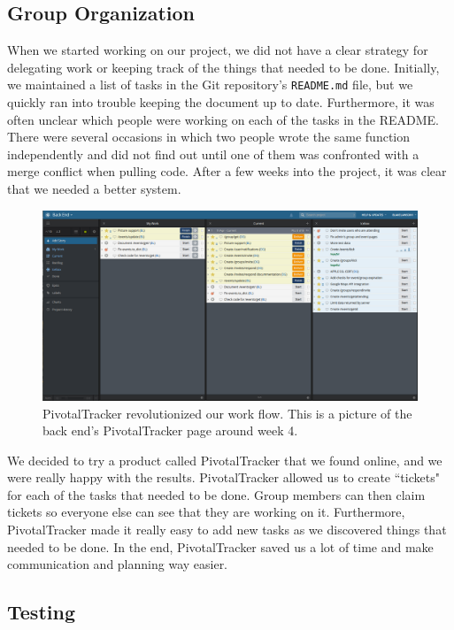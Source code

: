 \documentclass[12pt]{article}
\begin{document}
\subsection{Group Organization}

When we started working on our project, we did not have a clear strategy for 
delegating work or keeping track of the things that needed to be done.
Initially, we maintained a list of tasks in the Git repository's \texttt{README.md} file,
but we quickly ran into trouble keeping the document up to date.
Furthermore, it was often unclear which people were working on each of the tasks in the README.
There were several occasions in which two people wrote the same function independently
and did not find out until one of them was confronted with a merge conflict when pulling code.
After a few weeks into the project, it was clear that we needed a better system.

\begin{figure}
    \centering
    \includegraphics[scale=0.3]{pivotaltracker.png}
    \caption{
        PivotalTracker revolutionized our work flow. 
        This is a picture of the back end's PivotalTracker page around week 4.
    }
    \label{fig:pivotaltracker}
\end{figure}

We decided to try a product called PivotalTracker that we found online,
and we were really happy with the results.
PivotalTracker allowed us to create ``tickets" for each of the tasks that needed to be done.
Group members can then claim tickets so everyone else can see that they are working on it.
Furthermore, PivotalTracker made it really easy to add new tasks as we discovered things that needed to be done.
In the end, PivotalTracker saved us a lot of time and make communication and planning way easier.

\subsection{Testing}
\end{document}
